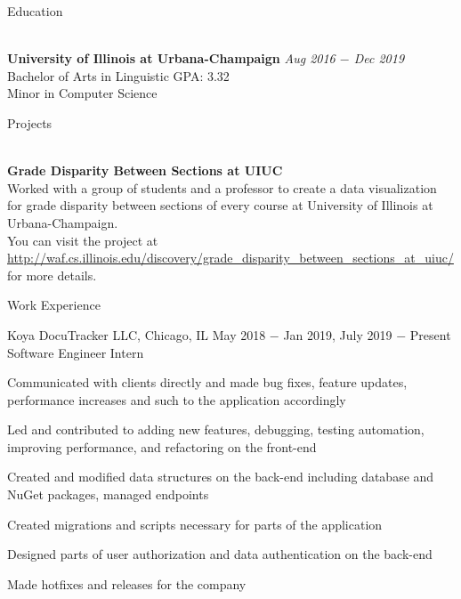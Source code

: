 \documentclass{resume}
\begin{document}
\begin{rSection}{Education}

\\{\bf University of Illinois at Urbana-Champaign} \hfill {\em Aug 2016 $-$ Dec 2019} 
\\ Bachelor of Arts in Linguistic\hfill { GPA: 3.32 } \\
Minor in Computer Science \smallskip \\

\end{rSection}

\begin{rSection}{Projects}

\\{\bf Grade Disparity Between Sections at UIUC} \\
Worked with a group of students and a professor to create a data visualization for grade disparity between sections of every course at University of Illinois at Urbana-Champaign.\\
You can visit the project at \url{http://waf.cs.illinois.edu/discovery/grade_disparity_between_sections_at_uiuc/} for more details.

\end{rSection}

\begin{rSection}{Work Experience}

\begin{rSubsection}{Koya DocuTracker LLC, Chicago, IL} {May 2018 $-$ Jan 2019, July 2019 $-$ Present}
{Software Engineer Intern}

    \item Communicated with clients directly and made bug fixes, feature updates, performance increases and such to the application accordingly
    \item Led and contributed to adding new features, debugging, testing automation, improving performance, and refactoring on the front-end
    \item Created and modified data structures on the back-end including database and NuGet packages, managed endpoints
    \item Created migrations and scripts necessary for parts of the application
    \item Designed parts of user authorization and data authentication on the back-end
    \item Made hotfixes and releases for the company

\end{rSubsection}

\end{rSection}
\end{document}
